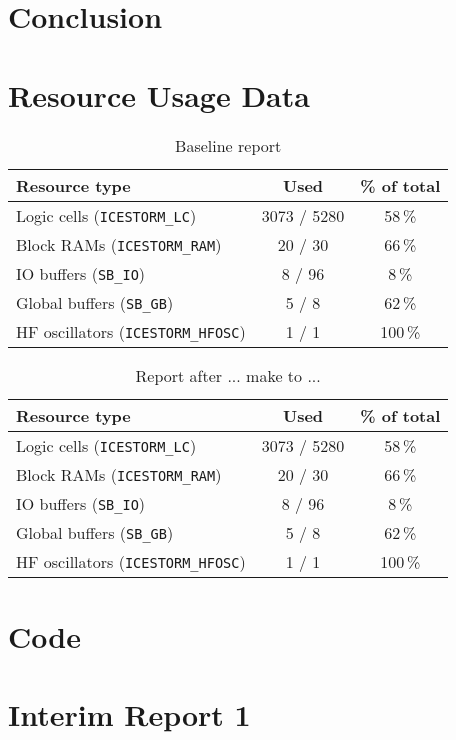 \documentclass[a4paper,10pt]{article}
\begin{document}
\section{Conclusion}
\label{sec:Conclusion}

\newpage
\appendix
\section{Resource Usage Data}

\begin{table}[H] 
    \centering
    \begin{tabularx}{0.6\textwidth}{X c c}
        \toprule
        Resource type & Used & \% of total \\ \midrule
        Logic cells (\texttt{ICESTORM\_LC}) & 3073 / 5280 & 58\,\% \\
        Block RAMs (\texttt{ICESTORM\_RAM}) & 20 / 30 & 66\,\% \\
        IO buffers (\texttt{SB\_IO}) & 8 / 96 & 8\,\% \\
        Global buffers (\texttt{SB\_GB}) & 5 / 8 & 62\,\% \\
        HF oscillators (\texttt{ICESTORM\_HFOSC}) & 1 / 1 & 100\,\% \\
        \bottomrule
    \end{tabularx}
    \caption{Baseline report}
    \label{tab:baseline}
\end{table}

\begin{table}[H] 
    \centering
    \begin{tabularx}{0.6\textwidth}{X c c}
        \toprule
        Resource type & Used & \% of total \\ \midrule
        Logic cells (\texttt{ICESTORM\_LC}) & 3073 / 5280 & 58\,\% \\
        Block RAMs (\texttt{ICESTORM\_RAM}) & 20 / 30 & 66\,\% \\
        IO buffers (\texttt{SB\_IO}) & 8 / 96 & 8\,\% \\
        Global buffers (\texttt{SB\_GB}) & 5 / 8 & 62\,\% \\
        HF oscillators (\texttt{ICESTORM\_HFOSC}) & 1 / 1 & 100\,\% \\
        \bottomrule
    \end{tabularx}
    \caption{Report after ... make to ...}
    \label{tab:bubblesort_pnr_report2}
\end{table}

\section{Code}

\section{Interim Report 1}
\label{sec:{Interim_Report_1}}

\end{document}
